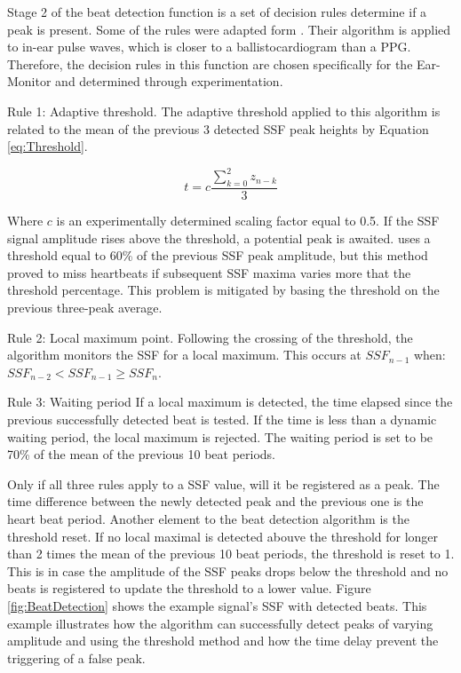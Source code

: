 Stage 2 of the beat detection function is a set of decision rules determine if a peak is present. Some of the rules were adapted form \cite{park2015wearable}. Their algorithm is applied to in-ear pulse waves, which is closer to a ballistocardiogram than a PPG. Therefore, the decision rules in this function are chosen specifically for the Ear-Monitor and determined through experimentation.

\medskip

Rule 1: Adaptive threshold. The adaptive threshold applied to this algorithm is related to the mean of the previous 3 detected SSF peak heights by Equation \ref{eq:Threshold}.

\begin{equation}
\label{eq:Threshold}
t=c\frac{\sum\nolimits_{k=0}^2 z_{n-k}}{3}
\end{equation}

Where $c$ is an experimentally determined scaling factor equal to 0.5. If the SSF signal amplitude rises above the threshold, a potential peak is awaited. \cite{zong2003open} uses a threshold equal to 60\% of the previous SSF peak amplitude, but this method proved to miss heartbeats if subsequent SSF maxima varies more that the threshold percentage. This problem is mitigated by basing the threshold on the previous three-peak average.

\medskip

Rule 2: Local maximum point. Following the crossing of the threshold, the algorithm monitors the SSF for a local maximum. This occurs at $SSF_{n-1}$ when: $SSF_{n-2} < SSF_{n-1} \ge SSF_n$.

\medskip

Rule 3: Waiting period
If a local maximum is detected, the time elapsed since the previous successfully detected beat is tested. If the time is less than a dynamic waiting period, the local maximum is rejected. The waiting period is set to be 70\% of the mean of the previous 10 beat periods.

\medskip

Only if all three rules apply to a SSF value, will it be registered as a peak. The time difference between the newly detected peak and the previous one is the heart beat period. Another element to the beat detection algorithm is the threshold reset. If no local maximal is detected abouve the threshold for longer than 2 times the mean of the previous 10 beat periods, the threshold is reset to 1. This is in case the amplitude of the SSF peaks drops below the threshold and no beats is registered to update the threshold to a lower value. Figure \ref{fig:BeatDetection} shows the example signal's SSF with detected beats. This example illustrates how the algorithm can successfully detect peaks of varying amplitude and using the threshold method and how the time delay prevent the triggering of a false peak.

